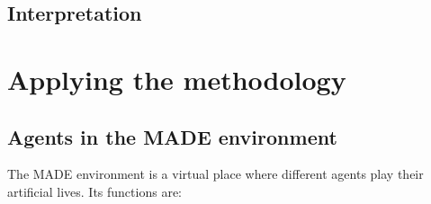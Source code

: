 \documentclass{sig-alternate}
\begin{document}
\subsection{Interpretation}




\section{Applying the methodology}
\label{sec:applying}

\subsection{Agents in the MADE environment}

The MADE environment is a virtual place where different agents play their artificial lives. Its functions are:
\end{document}

